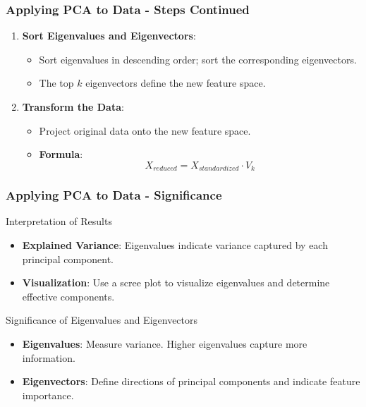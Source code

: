\documentclass[aspectratio=169]{beamer}
\begin{document}
\begin{frame}[fragile]
    \frametitle{Applying PCA to Data - Steps Continued}
    \begin{enumerate}[resume]
        \item \textbf{Sort Eigenvalues and Eigenvectors}:
            \begin{itemize}
                \item Sort eigenvalues in descending order; sort the corresponding eigenvectors.
                \item The top \(k\) eigenvectors define the new feature space.
            \end{itemize}
        \item \textbf{Transform the Data}:
            \begin{itemize}
                \item Project original data onto the new feature space.
                \item \textbf{Formula}:
                \begin{equation}
                    X_{reduced} = X_{standardized} \cdot V_k
                \end{equation}
            \end{itemize}
    \end{enumerate}
\end{frame}

\begin{frame}[fragile]
    \frametitle{Applying PCA to Data - Significance}
    \begin{block}{Interpretation of Results}
        \begin{itemize}
            \item \textbf{Explained Variance}: Eigenvalues indicate variance captured by each principal component.
            \item \textbf{Visualization}: Use a scree plot to visualize eigenvalues and determine effective components.
        \end{itemize}
    \end{block}

    \begin{block}{Significance of Eigenvalues and Eigenvectors}
        \begin{itemize}
            \item \textbf{Eigenvalues}: Measure variance. Higher eigenvalues capture more information.
            \item \textbf{Eigenvectors}: Define directions of principal components and indicate feature importance.
        \end{itemize}
    \end{block}
\end{frame}
\end{document}
